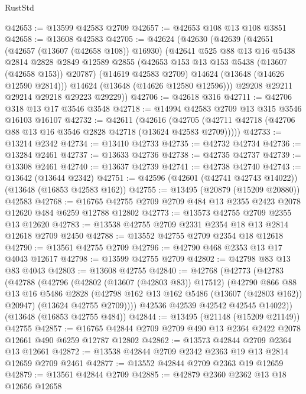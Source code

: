 \begin{lexlean}{RustStd}
\begin{coremodule}
@42653 := @13599 @42583 @2709
@42657 := @42653 @108 @13 @108 @3851
@42658 := @13608 @42583
@42705 := @42624
    (@42630
      (@42639
        (@42651
          (@42657 (@13607 (@42658 @108)) @16930)
          (@42641
            @525
            @88
            @13
            @16
            @5438
            @2814
            @2828
            @2849
            @12589
            @2855
            (@42653 @153 @13 @153 @5438 (@13607 (@42658 @153)) @20787)
            (@14619 @42583 @2709)
            @14624
            (@13648 (@14626 @12590 @2814)))
          @14624
          (@13648 (@14626 @12580 @12596)))
        @29208
        @29211
        @29214
        @29218
        @29223
        @29229))
@42706 := @42618 @316
@42711 := @42706 @318 @13 @17 @3546 @3548
@42718 := @14994 @42583 @2709 @13 @315 @3546 @16103 @16107
@42732 := @42611
    (@42616 (@42705 (@42711 @42718 (@42706 @88 @13 @16 @3546 @2828 @42718 (@13624 @42583 @2709)))))
@42733 := @13214 @2342
@42734 := @13410 @42733
@42735 := @42732 @42734
@42736 := @13284 @2461
@42737 := @13633 @42736
@42738 := @42735 @42737
@42739 := @13308 @2461
@42740 := @13637 @42739
@42741 := @42738 @42740
@42743 := @13642 (@13644 @2342)
@42751 := @42596 (@42601 (@42741 @42743 @14022)) (@13648 (@16853 @42583 @162))
@42755 := @13495 (@20879 (@15209 @20880)) @42583
@42768 := @16765 @42755 @2709 @2709 @484 @13 @2355 @2423 @2078 @12620 @484 @6259 @12788 @12802
@42773 := @13573 @42755 @2709 @2355 @13 @12620
@42783 := @13538 @42755 @2709 @2331 @2354 @18 @13 @2814 @12618 @2709 @2450
@42788 := @13552 @42755 @2709 @2354 @18 @12618
@42790 := @13561 @42755 @2709
@42796 := @42790 @468 @2353 @13 @17 @4043 @12617
@42798 := @13599 @42755 @2709
@42802 := @42798 @83 @13 @83 @4043
@42803 := @13608 @42755
@42840 := @42768
    (@42773
      (@42783
        (@42788
          (@42796
            (@42802 (@13607 (@42803 @83)) @17512)
            (@42790
              @866
              @88
              @13
              @16
              @5486
              @2828
              (@42798 @162 @13 @162 @5486 (@13607 (@42803 @162)) @20947)
              (@13624 @42755 @2709))))
        @42536
        @42539
        @42542
        @42545
        @14022))
    (@13648 (@16853 @42755 @484))
@42844 := @13495 (@21148 (@15209 @21149)) @42755
@42857 := @16765 @42844 @2709 @2709 @490 @13 @2364 @2422 @2078 @12661 @490 @6259 @12787 @12802
@42862 := @13573 @42844 @2709 @2364 @13 @12661
@42872 := @13538 @42844 @2709 @2342 @2363 @19 @13 @2814 @12659 @2709 @2461
@42877 := @13552 @42844 @2709 @2363 @19 @12659
@42879 := @13561 @42844 @2709
@42885 := @42879 @2360 @2362 @13 @18 @12656 @12658

\end{coremodule}
\end{lexlean}
